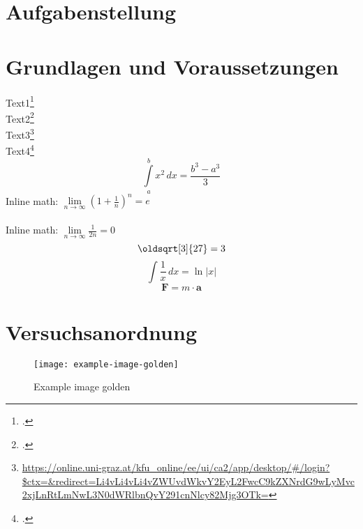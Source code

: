 \documentclass[ngerman]{scrartcl}
\renewcommand*{\sqrt}[2][\ ]{\oldsqrt[#1]{#2} }
\begin{document}


\clearpage
\tableofcontents
\newpage

\section{Aufgabenstellung}
\label{sec:aufgabenstellung}



\section{Grundlagen und Voraussetzungen}
\label{sec:grundlagen_voraussetzungen}

Text1\footcite[1000]{ref:dem1} \\
Text2\footcite[Kapitel 74]{ref:knoll} \\
Text3\footnote{\url{https://online.uni-graz.at/kfu_online/ee/ui/ca2/app/desktop/\#/login?$ctx=&redirect=Li4vLi4vLi4vZWUvdWkvY2EyL2FwcC9kZXNrdG9wLyMvc2xjLnRtLmNwL3N0dWRlbnQvY291cnNlcy82Mjg3OTk=}} \\  %
Text4\footcite{ref:genol2013}
%
\begin{equation}
\label{eq:grenzen-oben-unten}
    \int \limits_{a}^{b} x^2 \, dx =\frac{b^3-a^3}{3}  %
\end{equation}
%
Inline math: \(\lim \limits_{n \to \infty} \left( 1 + \frac{1}{n} \right) ^{n} = e\)  \\ \\ %
Inline math: $\lim \limits_{n \to \infty} \frac{1}{2n} = 0$  %
%
\begin{displaymath}
    \sqrt[3]{27} = 3
\end{displaymath}
%
\[ \int \frac{1}{x} \, dx = \ln|x| \]  %
$$ \textbf{F} = m \cdot \textbf{a} $$  %



\section{Versuchsanordnung}
\label{sec:versuchsanordnung}

\begin{figure}[!h]
    \centering
    \begin{samepage}
        \texttt{[image: example-image-golden]}
        \caption{Example image golden}
        \label{fig:example-image-golden}
    \end{samepage}
\end{figure}
\end{document}
